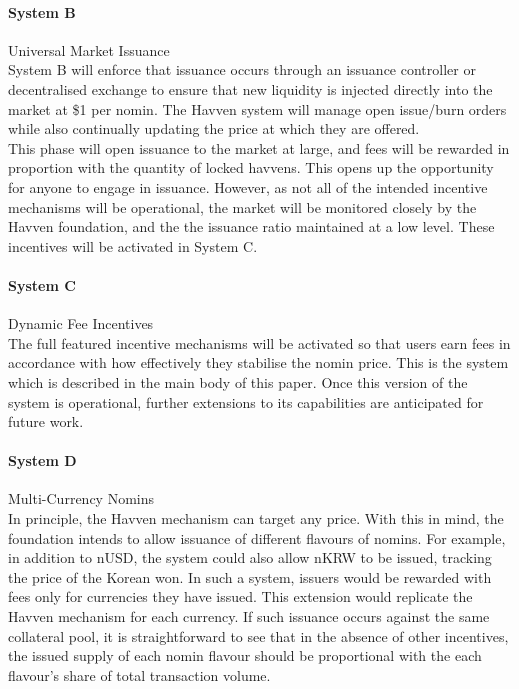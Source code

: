 \paragraph{System B} Universal Market Issuance \\

\noindent System B will enforce that issuance occurs through an issuance controller or
decentralised exchange to ensure that new liquidity is injected directly
into the market at \$1 per nomin. The Havven system will manage open
issue/burn orders while also continually updating the price at which they are
offered. \\

\noindent This phase will open issuance to the market at large, and fees will be rewarded
in proportion with the quantity of locked havvens. This opens up the opportunity
for anyone to engage in issuance. However, as not all of the intended incentive
mechanisms will be operational, the market will be monitored closely by the Havven
foundation, and the the issuance ratio maintained at a low level. These incentives will
be activated in System C. \\


\paragraph{System C} Dynamic Fee Incentives \\

\noindent The full featured incentive mechanisms will be activated so that users earn fees
in accordance with how effectively they stabilise the nomin price. This is the
system which is described in the main body of this paper. Once this version of the system
is operational, further extensions to its capabilities are anticipated for future work. \\


\paragraph{System D} Multi-Currency Nomins \\

\noindent In principle, the Havven mechanism can target any price. 
With this in mind, the foundation intends to allow issuance
of different flavours of nomins. For example, in addition to 
nUSD, the system could also allow nKRW to be issued, tracking
the price of the Korean won. In such a system, issuers would be
rewarded with fees only for currencies they have issued. This extension
would replicate the Havven mechanism for each currency. 
If such issuance occurs against the same collateral pool, it is
straightforward to see that in the absence of other incentives,
the issued supply of each nomin flavour should be proportional with the
each flavour's share of total transaction volume. \\

